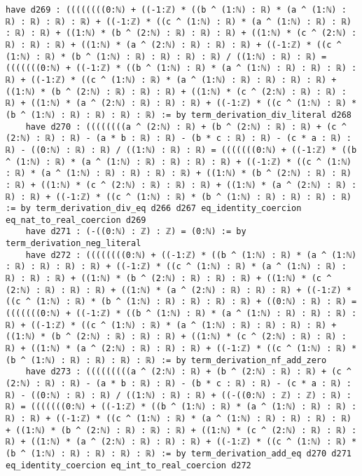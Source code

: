 \documentclass{article}
\begin{document}
\begin{tcolorbox}[colback=white!10, width=\linewidth]
\begin{lstlisting}[language=Lean4]
    have d269 : ((((((((0:ℕ) + ((-1:ℤ) * ((b ^ (1:ℕ) : ℝ) * (a ^ (1:ℕ) : ℝ) : ℝ) : ℝ) : ℝ) + ((-1:ℤ) * ((c ^ (1:ℕ) : ℝ) * (a ^ (1:ℕ) : ℝ) : ℝ) : ℝ) : ℝ) + ((1:ℕ) * (b ^ (2:ℕ) : ℝ) : ℝ) : ℝ) + ((1:ℕ) * (c ^ (2:ℕ) : ℝ) : ℝ) : ℝ) + ((1:ℕ) * (a ^ (2:ℕ) : ℝ) : ℝ) : ℝ) + ((-1:ℤ) * ((c ^ (1:ℕ) : ℝ) * (b ^ (1:ℕ) : ℝ) : ℝ) : ℝ) : ℝ) / ((1:ℕ) : ℝ) : ℝ) = (((((((0:ℕ) + ((-1:ℤ) * ((b ^ (1:ℕ) : ℝ) * (a ^ (1:ℕ) : ℝ) : ℝ) : ℝ) : ℝ) + ((-1:ℤ) * ((c ^ (1:ℕ) : ℝ) * (a ^ (1:ℕ) : ℝ) : ℝ) : ℝ) : ℝ) + ((1:ℕ) * (b ^ (2:ℕ) : ℝ) : ℝ) : ℝ) + ((1:ℕ) * (c ^ (2:ℕ) : ℝ) : ℝ) : ℝ) + ((1:ℕ) * (a ^ (2:ℕ) : ℝ) : ℝ) : ℝ) + ((-1:ℤ) * ((c ^ (1:ℕ) : ℝ) * (b ^ (1:ℕ) : ℝ) : ℝ) : ℝ) : ℝ) := by term_derivation_div_literal d268
    have d270 : ((((((((a ^ (2:ℕ) : ℝ) + (b ^ (2:ℕ) : ℝ) : ℝ) + (c ^ (2:ℕ) : ℝ) : ℝ) - (a * b : ℝ) : ℝ) - (b * c : ℝ) : ℝ) - (c * a : ℝ) : ℝ) - ((0:ℕ) : ℝ) : ℝ) / ((1:ℕ) : ℝ) : ℝ) = (((((((0:ℕ) + ((-1:ℤ) * ((b ^ (1:ℕ) : ℝ) * (a ^ (1:ℕ) : ℝ) : ℝ) : ℝ) : ℝ) + ((-1:ℤ) * ((c ^ (1:ℕ) : ℝ) * (a ^ (1:ℕ) : ℝ) : ℝ) : ℝ) : ℝ) + ((1:ℕ) * (b ^ (2:ℕ) : ℝ) : ℝ) : ℝ) + ((1:ℕ) * (c ^ (2:ℕ) : ℝ) : ℝ) : ℝ) + ((1:ℕ) * (a ^ (2:ℕ) : ℝ) : ℝ) : ℝ) + ((-1:ℤ) * ((c ^ (1:ℕ) : ℝ) * (b ^ (1:ℕ) : ℝ) : ℝ) : ℝ) : ℝ) := by term_derivation_div_eq d266 d267 eq_identity_coercion eq_nat_to_real_coercion d269
    have d271 : (-((0:ℕ) : ℤ) : ℤ) = (0:ℕ) := by term_derivation_neg_literal
    have d272 : ((((((((0:ℕ) + ((-1:ℤ) * ((b ^ (1:ℕ) : ℝ) * (a ^ (1:ℕ) : ℝ) : ℝ) : ℝ) : ℝ) + ((-1:ℤ) * ((c ^ (1:ℕ) : ℝ) * (a ^ (1:ℕ) : ℝ) : ℝ) : ℝ) : ℝ) + ((1:ℕ) * (b ^ (2:ℕ) : ℝ) : ℝ) : ℝ) + ((1:ℕ) * (c ^ (2:ℕ) : ℝ) : ℝ) : ℝ) + ((1:ℕ) * (a ^ (2:ℕ) : ℝ) : ℝ) : ℝ) + ((-1:ℤ) * ((c ^ (1:ℕ) : ℝ) * (b ^ (1:ℕ) : ℝ) : ℝ) : ℝ) : ℝ) + ((0:ℕ) : ℝ) : ℝ) = (((((((0:ℕ) + ((-1:ℤ) * ((b ^ (1:ℕ) : ℝ) * (a ^ (1:ℕ) : ℝ) : ℝ) : ℝ) : ℝ) + ((-1:ℤ) * ((c ^ (1:ℕ) : ℝ) * (a ^ (1:ℕ) : ℝ) : ℝ) : ℝ) : ℝ) + ((1:ℕ) * (b ^ (2:ℕ) : ℝ) : ℝ) : ℝ) + ((1:ℕ) * (c ^ (2:ℕ) : ℝ) : ℝ) : ℝ) + ((1:ℕ) * (a ^ (2:ℕ) : ℝ) : ℝ) : ℝ) + ((-1:ℤ) * ((c ^ (1:ℕ) : ℝ) * (b ^ (1:ℕ) : ℝ) : ℝ) : ℝ) : ℝ) := by term_derivation_nf_add_zero
    have d273 : (((((((((a ^ (2:ℕ) : ℝ) + (b ^ (2:ℕ) : ℝ) : ℝ) + (c ^ (2:ℕ) : ℝ) : ℝ) - (a * b : ℝ) : ℝ) - (b * c : ℝ) : ℝ) - (c * a : ℝ) : ℝ) - ((0:ℕ) : ℝ) : ℝ) / ((1:ℕ) : ℝ) : ℝ) + ((-((0:ℕ) : ℤ) : ℤ) : ℝ) : ℝ) = (((((((0:ℕ) + ((-1:ℤ) * ((b ^ (1:ℕ) : ℝ) * (a ^ (1:ℕ) : ℝ) : ℝ) : ℝ) : ℝ) + ((-1:ℤ) * ((c ^ (1:ℕ) : ℝ) * (a ^ (1:ℕ) : ℝ) : ℝ) : ℝ) : ℝ) + ((1:ℕ) * (b ^ (2:ℕ) : ℝ) : ℝ) : ℝ) + ((1:ℕ) * (c ^ (2:ℕ) : ℝ) : ℝ) : ℝ) + ((1:ℕ) * (a ^ (2:ℕ) : ℝ) : ℝ) : ℝ) + ((-1:ℤ) * ((c ^ (1:ℕ) : ℝ) * (b ^ (1:ℕ) : ℝ) : ℝ) : ℝ) : ℝ) := by term_derivation_add_eq d270 d271 eq_identity_coercion eq_int_to_real_coercion d272

\end{lstlisting}
\end{tcolorbox}
\end{document}
